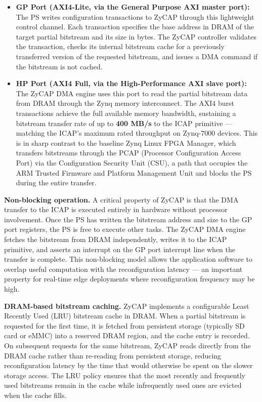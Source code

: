 \begin{itemize}
  \item \textbf{GP Port (AXI4-Lite, via the General Purpose AXI master port):} The PS writes configuration transactions to ZyCAP through this lightweight control channel. Each transaction specifies the base address in DRAM of the target partial bitstream and its size in bytes. The ZyCAP controller validates the transaction, checks its internal bitstream cache for a previously transferred version of the requested bitstream, and issues a DMA command if the bitstream is not cached.
  \item \textbf{HP Port (AXI4 Full, via the High-Performance AXI slave port):} The ZyCAP DMA engine uses this port to read the partial bitstream data from DRAM through the Zynq memory interconnect. The AXI4 burst transactions achieve the full available memory bandwidth, sustaining a bitstream transfer rate of up to \textbf{400 MB/s} to the ICAP primitive — matching the ICAP's maximum rated throughput on Zynq-7000 devices. This is in sharp contrast to the baseline Zynq Linux FPGA Manager, which transfers bitstreams through the PCAP (Processor Configuration Access Port) via the Configuration Security Unit (CSU), a path that occupies the ARM Trusted Firmware and Platform Management Unit and blocks the PS during the entire transfer.
\end{itemize}
\textbf{Non-blocking operation.} A critical property of ZyCAP is that the DMA transfer to the ICAP is executed entirely in hardware without processor involvement. Once the PS has written the bitstream address and size to the GP port registers, the PS is free to execute other tasks. The ZyCAP DMA engine fetches the bitstream from DRAM independently, writes it to the ICAP primitive, and asserts an interrupt on the GP port interrupt line when the transfer is complete. This non-blocking model allows the application software to overlap useful computation with the reconfiguration latency — an important property for real-time edge deployments where reconfiguration frequency may be high.

\textbf{DRAM-based bitstream caching.} ZyCAP implements a configurable Least Recently Used (LRU) bitstream cache in DRAM. When a partial bitstream is requested for the first time, it is fetched from persistent storage (typically SD card or eMMC) into a reserved DRAM region, and the cache entry is recorded. On subsequent requests for the same bitstream, ZyCAP reads directly from the DRAM cache rather than re-reading from persistent storage, reducing reconfiguration latency by the time that would otherwise be spent on the slower storage access. The LRU policy ensures that the most recently and frequently used bitstreams remain in the cache while infrequently used ones are evicted when the cache fills.


